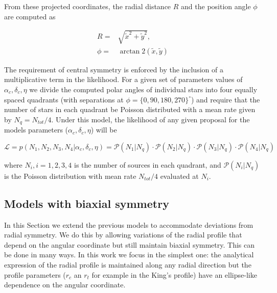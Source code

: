 From these projected coordinates, the radial distance $R$ and the position angle $\phi$ are computed as 

\begin{align}
R=& \sqrt{\tilde{x}^2 + \tilde{y}^2},\nonumber\\
\phi=& \arctan2 (\tilde{x},\tilde{y})
\end{align}
 


The requirement of central symmetry is enforced by the inclusion of a multiplicative term in the likelihood. For a given set of parameters values of $\alpha_c, \delta_c, \eta$ we divide the computed polar angles of individual stars into four equally spaced quadrants (with separations at $\phi=\{0,90,180,270\}^{\circ}$) and require that the number of stars in each quadrant be Poisson distributed with a mean rate given by $N_q=N_{tot}/4$. Under this model, the likelihood of any given proposal for the models parameters ($\alpha_c,\delta_c,\eta$) will be

\begin{equation}
\mathcal{L}= p(N_1,N_2,N_3,N_4|\alpha_c,\delta_c,\eta) =\mathcal{P}(N_1|N_q)\cdot \mathcal{P}(N_2|N_q)\cdot \mathcal{P}(N_3|N_q)\cdot
\mathcal{P}(N_4|N_q) 
\end{equation}

where $N_i, i=1,2,3,4$ is the number of sources in each quadrant, and $\mathcal{P}(N_i|N_q)$ is the Poisson distribution with mean rate $N_{tot}/4$ evaluated at $N_i$.

%
%

\subsection{Models with biaxial symmetry}
\label{sect:EllipticModels}

In this Section we extend the previous models to accommodate deviations from radial symmetry. We do this by allowing variations of the radial profile that depend on the angular coordinate but still maintain biaxial symmetry. This can be done in many ways. In this work we focus in the simplest one: the analytical expression of the radial profile is maintained along any radial direction but the profile parameters ($r_c$ an $r_t$ for example in the King's profile) have an ellipse-like dependence on the angular coordinate.

